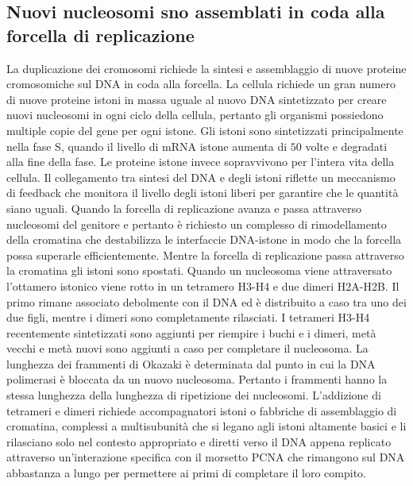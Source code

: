 \subsection{Nuovi nucleosomi sno assemblati in coda alla forcella di replicazione}
La duplicazione dei cromosomi richiede la sintesi e assemblaggio di nuove proteine cromosomiche sul DNA in coda alla forcella. La cellula richiede un gran numero di nuove proteine 
istoni in massa uguale al nuovo DNA sintetizzato per creare nuovi nucleosomi in ogni ciclo della cellula, pertanto gli organismi possiedono multiple copie del gene per ogni istone. Gli
istoni sono sintetizzati principalmente nella fase S, quando il livello di mRNA istone aumenta di $50$ volte e degradati alla fine della fase. Le proteine istone invece sopravvivono per
l'intera vita della cellula. Il collegamento tra sintesi del DNA e degli istoni riflette un meccanismo di feedback che monitora il livello degli istoni liberi per garantire che le 
quantit\`a siano uguali. Quando la forcella di replicazione avanza e passa attraverso nucleosomi del genitore e pertanto \`e richiesto un complesso di rimodellamento della cromatina
che destabilizza le interfaccie DNA-istone in modo che la forcella possa superarle efficientemente. Mentre la forcella di replicazione passa attraverso la cromatina gli istoni sono
spostati. Quando un nucleosoma viene attraversato l'ottamero istonico viene rotto in un tetramero H3-H4 e due dimeri H2A-H2B. Il primo rimane associato debolmente con il DNA ed \`e
distribuito a caso tra uno dei due figli, mentre i dimeri sono completamente rilasciati. I tetrameri H3-H4 recentemente sintetizzati sono aggiunti per riempire i buchi e i dimeri, met\`a
vecchi e met\`a nuovi sono aggiunti a caso per completare il nucleosoma. La lunghezza dei frammenti di Okazaki \`e determinata dal punto in cui la DNA polimerasi \`e bloccata da un 
nuovo nucleosoma. Pertanto i frammenti hanno la stessa lunghezza della lunghezza di ripetizione dei nucleosomi. L'addizione di tetrameri e dimeri richiede accompagnatori istoni o 
fabbriche di assemblaggio di cromatina, complessi a multisubunit\`a che si legano agli istoni altamente basici e li rilasciano solo nel contesto appropriato e diretti verso il DNA 
appena replicato attraverso un'interazione specifica con il morsetto PCNA che rimangono sul DNA abbastanza a lungo per permettere ai primi di completare il loro compito.
